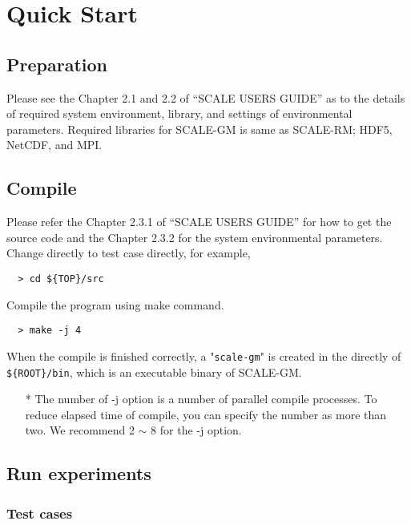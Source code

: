 \section{Quick Start}

\subsection{Preparation}
Please see the Chapter 2.1 and 2.2 of ``SCALE USERS GUIDE''
as to the details of required system environment, library, and settings of environmental parameters.
Required libraries for SCALE-GM is same as SCALE-RM; HDF5, NetCDF, and MPI.

\subsection{Compile}
Please refer the Chapter 2.3.1 of ``SCALE USERS GUIDE'' for how to get the source code
and the Chapter 2.3.2 for the system environmental parameters.
Change directly to test case directly, for example,

\begin{verbatim}
  > cd ${TOP}/src
\end{verbatim}

\noindent Compile the program using make command.
\begin{verbatim}
  > make -j 4
\end{verbatim}
When the compile is finished correctly,
a "\verb|scale-gm|" is created in the directly of \verb|${ROOT}/bin|,
which is an executable binary of SCALE-GM.

\begin{itemize}
  \item[*] The number of -j option is a number of parallel compile processes.
   To reduce elapsed time of compile, you can specify the number
   as more than two. We recommend 2 $\sim$ 8 for the -j option.
\end{itemize}

\subsection{Run experiments}
\subsubsection{Test cases}

